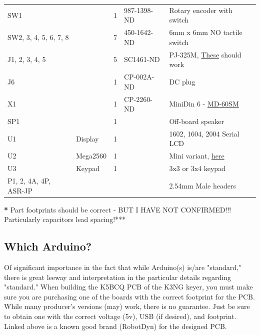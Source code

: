 \documentclass[11pt]{article}
\begin{document}
\begin{center}
\begin{tabular}{llrll}
SW1 &  & 1 & 987-1398-ND & Rotary encoder with switch\\
SW2, 3, 4, 5, 6, 7, 8 &  & 7 & 450-1642-ND & 6mm x 6mm NO tactile switch\\
J1, 2, 3, 4, 5 &  & 5 & SC1461-ND & PJ-325M, \href{https://www.digikey.com/product-detail/en/switchcraft-inc/35RAPC4BV4/SC1461-ND/528670}{These} should work\\
J6 &  & 1 & CP-002A-ND & DC plug\\
X1 &  & 1 & CP-2260-ND & MiniDin 6 - \href{https://www.digikey.com/product-detail/en/cui-inc/MD-60SM/CP-2260-ND/96940}{MD-60SM}\\
SP1 &  & 1 &  & Off-board speaker\\
U1 & Display & 1 &  & 1602, 1604, 2004 Serial LCD\\
U2 & Mega2560 & 1 &  & Mini variant, \href{https://robotdyn.com/mega-2560-pro-mini-atmega2560-16au.html}{here}\\
U3 & Keypad & 1 &  & 3x3 or 3x4 keypad\\
P1, 2, 4A, 4P, ASR-JP &  &  &  & 2.54mm Male headers\\
\end{tabular}
\end{center}
\textbf{*} Part footprints should be correct - BUT I HAVE NOT CONFIRMED!!! Particularly capacitors lead spacing!***


\subsection{Which Arduino?}
\label{sec:orgb86b93b}

Of significant importance in the fact that while Arduino(s) is/are "standard," there is great leeway and interpretation in the particular details regarding "standard."  When building the K5BCQ PCB of the K3NG keyer, you must make sure you are purchasing one of the boards with the correct footprint for the PCB.  While many producer's versions (may) work, there is no guarantee.  Just be sure to obtain one with the correct voltage (5v), USB (if desired), and footprint.  Linked above is a known good brand (RobotDyn) for the designed PCB.
\end{document}
